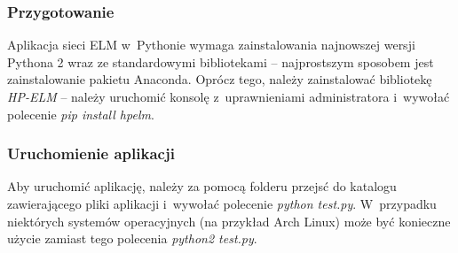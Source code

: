 \documentclass{article}
\begin{document}
\subsubsection*{Przygotowanie}
Aplikacja sieci ELM w~Pythonie wymaga zainstalowania najnowszej wersji Pythona 2 wraz ze standardowymi bibliotekami -- najprostszym sposobem jest zainstalowanie pakietu Anaconda. Oprócz tego, należy zainstalować bibliotekę \textit{HP-ELM} -- należy uruchomić konsolę z~uprawnieniami administratora i~wywołać polecenie \textit{pip install hpelm}. 
\subsubsection*{Uruchomienie aplikacji}
Aby uruchomić aplikację, należy za pomocą folderu przejsć do katalogu zawierającego pliki aplikacji i~wywołać polecenie \textit{python test.py}. W~przypadku niektórych systemów operacyjnych (na przykład Arch Linux) może być konieczne użycie zamiast tego polecenia \textit{python2 test.py}.
\end{document}
